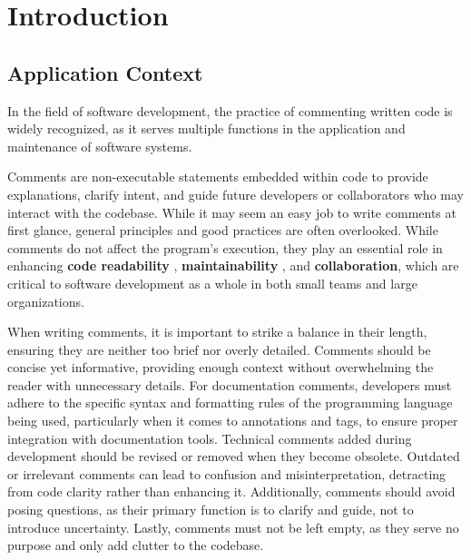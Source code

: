 
\chapter{Introduction} %

\label{Chapter1} %


\newcommand{\keyword}[1]{\textbf{#1}}
\newcommand{\tabhead}[1]{\textbf{#1}}
\newcommand{\code}[1]{\texttt{#1}}
\newcommand{\file}[1]{\texttt{\bfseries#1}}
\newcommand{\option}[1]{\texttt{\itshape#1}}


\section{Application Context} In the field of software development, the practice of commenting written code is widely recognized, as it serves multiple functions in the application and maintenance of software systems.

\noindent Comments are non-executable statements embedded within code to provide explanations, clarify intent, and guide future developers or collaborators who may interact with the codebase. While it may seem an easy job to write comments at first glance, general principles and good practices \cite{commentingPrinciples} are often overlooked.
While comments do not affect the program’s execution, they play an essential role in enhancing \textbf{code readability} \cite{codeReadability}, \textbf{maintainability} \cite{codeMaintainability}, and \textbf{collaboration}, which are critical to software development as a whole in both small teams and large organizations.

\noindent When writing comments, it is important to strike a balance in their length, ensuring they are neither too brief nor overly detailed. Comments should be concise yet informative, providing enough context without overwhelming the reader with unnecessary details.
For documentation comments, developers must adhere to the specific syntax and formatting rules of the programming language being used, particularly when it comes to annotations and tags, to ensure proper integration with documentation tools.
Technical comments added during development should be revised or removed when they become obsolete. Outdated or irrelevant comments can lead to confusion and misinterpretation, detracting from code clarity rather than enhancing it.
Additionally, comments should avoid posing questions, as their primary function is to clarify and guide, not to introduce uncertainty. Lastly, comments must not be left empty, as they serve no purpose and only add clutter to the codebase.


